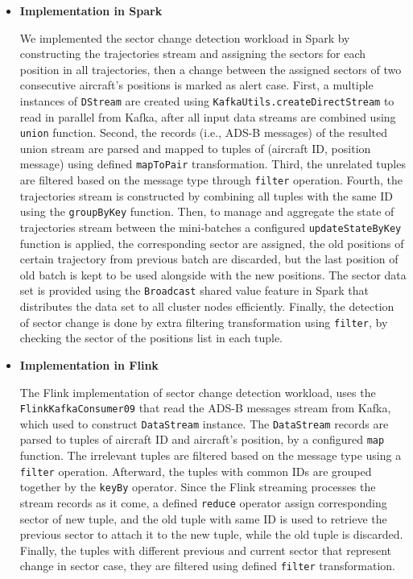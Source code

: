\documentclass[]{article}
\begin{document}
 \begin{itemize}
 \item {\bf{Implementation in Spark }}
 
 We implemented the sector change detection workload in Spark by constructing the trajectories stream and assigning the sectors for each position in all trajectories, then a change between the assigned sectors of two consecutive aircraft's positions is marked as alert case. First, a multiple instances of \texttt{DStream} are created using \texttt{KafkaUtils.createDirectStream} to read in  parallel from Kafka, after  all input data streams are combined using \texttt{union} function. Second, the records (i.e., ADS-B messages) of the resulted union stream are parsed and mapped to tuples of (aircraft ID, position message) using defined \texttt{mapToPair} transformation. Third, the unrelated  tuples are filtered based on the message type through \texttt{filter} operation. Fourth, the trajectories stream is constructed by combining all tuples with the same ID using the \texttt{groupByKey} function. Then, to manage and aggregate the state of trajectories stream between the mini-batches a configured \texttt{updateStateByKey} function is applied,  the corresponding sector are assigned, the old positions of certain trajectory from previous batch are discarded, but the last position of old batch is kept to be used alongside with the new positions.
 The sector data set is provided using the \texttt{Broadcast} shared value feature in Spark that distributes the  data set to all cluster nodes efficiently. Finally, the detection of sector change is done by extra filtering transformation using \texttt{filter}, by checking the sector of the positions list in each tuple.

 
  
 \item {\bf{Implementation in Flink }}
 
 The Flink implementation of sector change detection workload, uses the \texttt{FlinkKafkaConsumer09} that read the ADS-B messages stream from Kafka, which used to construct \texttt{DataStream} instance. The \texttt{DataStream} records are parsed to tuples of aircraft ID and aircraft's position, by a configured \texttt{map} function. The irrelevant tuples are filtered based on the message type using a \texttt{filter} operation. Afterward, the tuples with common IDs are grouped together by the \texttt{keyBy} operator. Since the Flink streaming processes the stream records as it come, a defined \texttt{reduce} operator assign corresponding sector of new tuple, and the old tuple with same ID is used to retrieve the previous sector to attach it to the new tuple, while the old tuple is discarded. Finally, the tuples with different previous and current sector that represent change in sector case, they are filtered using defined \texttt{filter} transformation.
 \end{itemize}
\end{document}
